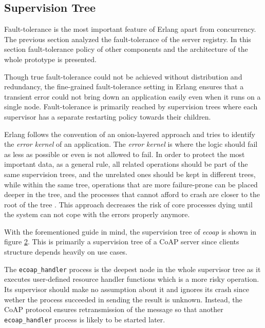 \begin{figure}
\label{fig:coap_registry}
\end{figure}

\subsection{Supervision Tree}\label{supervision_tree}

Fault-tolerance is the most important feature of Erlang apart from concurrency. The previous section analyzed the fault-tolerance of the server registry. In this section fault-tolerance policy of other components and the architecture of the whole prototype is presented.

Though true fault-tolerance could not be achieved without distribution and redundancy, the fine-grained fault-tolerance setting in Erlang ensures that a transient error could not bring down an application easily even when it runs on a single node. Fault-tolerance is primarily reached by supervision trees where each supervisor has a separate restarting policy towards their children. 

Erlang follows the convention of an onion-layered approach and tries to identify the \textit{error kernel} of an application. The \textit{error kernel} is where the logic should fail as less as possible or even is not allowed to fail. In order to protect the most important data, as a general rule, all related operations should be part of the same supervision trees, and the unrelated ones should be kept in different trees, while within the same tree, operations that are more failure-prone can be placed deeper in the tree, and the processes that cannot afford to crash are closer to the root of the tree \cite{learn_you_some_erlang}. This approach decreases the risk of core processes dying until the system can not cope with the errors properly anymore.

With the forementioned guide in mind, the supervision tree of \textit{ecoap} is shown in figure \ref{fig:system_arch}. This is primarily a supervision tree of a CoAP server since clients structure depends heavily on use cases. 

\begin{figure}
\label{fig:system_arch}
\end{figure}

The \verb|ecoap_handler| process is the deepest node in the whole supervisor tree as it executes user-defined resource handler functions which is a more risky operation. Its supervisor should make no assumption about it and ignores its crash since wether the process succeeded in sending the result is unknown. Instead, the CoAP protocol ensures retransmission of the message so that another \verb|ecoap_handler| process is likely to be started later. 

